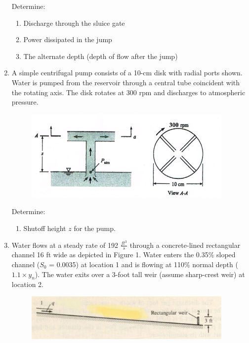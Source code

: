 \documentclass[12pt]{article}
\begin{document}
\begin{enumerate}
Determine:
\begin{enumerate}
\item Discharge through the sluice gate
\item Power dissipated in the jump
\item The alternate depth (depth of flow after the jump)
\end{enumerate}
\clearpage

\item A simple centrifugal pump consists of a 10-cm disk with radial ports shown.  Water is pumped from the reservoir through a central tube coincident with the rotating axis.  The disk rotates at 300 rpm and discharges to atmospheric pressure.  

\begin{figure}[htbp] %
   \centering
   \includegraphics[width=4in]{centrifugepump.png} 
   \caption{}
   \label{fig:centrifugepump}
\end{figure}

Determine:
\begin{enumerate}
\item Shutoff height $z$ for the pump.
\end{enumerate}
\clearpage

\item Water flows at a steady rate of 192 $\frac{ft^3}{s}$ through a concrete-lined rectangular channel 16 ft wide as depicted in Figure 1. Water enters the 0.35\% sloped channel ($S_0$ = 0.0035) at location 1 and is flowing at 110\% normal depth ($1.1 \times y_n$). The water exits over a 3-foot tall weir (assume sharp-crest weir) at location 2.

\begin{figure}[htbp] %
   \centering
   \includegraphics[width=4in]{channel_profile.png} 
   \caption{}
   \label{fig:channel_profile}
\end{figure}


\end{enumerate}
\end{document}

